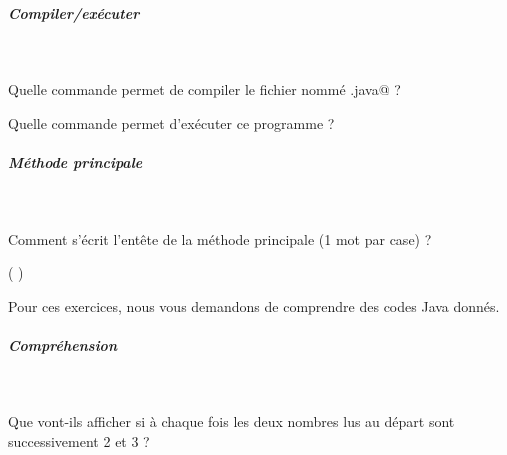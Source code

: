 \documentclass[11pt,a4paper]{article}
\begin{document}
		\subparagraph{Compiler/ex\'ecuter} 
		
                \textcolor{white}{.} \par
             
							Quelle commande permet de compiler le fichier nomm\'e \verb@SommeChiffres.java@ ?  
							\par
				 \textcolor{gray}{\underline{\hspace*{3em}}}  \textcolor{gray}{\underline{\hspace*{16em}}} \par
				
							Quelle commande permet d'ex\'ecuter ce programme ?  
							\par
				 \textcolor{gray}{\underline{\hspace*{3em}}}  \textcolor{gray}{\underline{\hspace*{10em}}} 
			
		\subparagraph{M\'ethode principale} 
		
                \textcolor{white}{.} \par
            
								Comment s'\'ecrit l'ent\^ete de la m\'ethode principale (1 mot par case) ?
							
            \par
         \textcolor{gray}{\underline{\hspace*{5em}}}  \textcolor{gray}{\underline{\hspace*{5em}}}  \textcolor{gray}{\underline{\hspace*{3em}}}  \textcolor{gray}{\underline{\hspace*{3em}}}  
							(            
							 \textcolor{gray}{\underline{\hspace*{5em}}}  \textcolor{gray}{\underline{\hspace*{2em}}}  \textcolor{gray}{\underline{\hspace*{3em}}}  
							)   
						
          Pour ces exercices, nous vous demandons de comprendre des codes Java donn\'es. 
          
			
		\subparagraph{Compr\'ehension} 
		
                \textcolor{white}{.} \par
            
							  Que vont-ils afficher si \`a chaque fois les deux nombres lus au d\'epart sont successivement 2 et 3 ?
							
\end{document}
